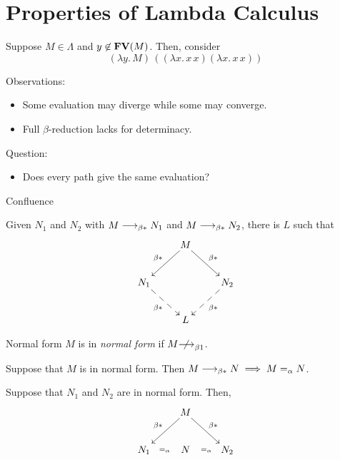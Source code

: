 \section{Properties of Lambda Calculus}

\begin{frame}
  \begin{example}
    Suppose $M \in \Lambda$ and $y \not\in \mathbf{FV}(M)$. 
    Then, consider 
    \[
      (\lambda y.\, M)\, ((\lambda x.\, x\,x)(\lambda x.\, x\, x))
    \]
  \end{example}
  Observations:
  \begin{itemize}
    \item Some evaluation may diverge while some may converge.
    \item Full $\beta$-reduction lacks for determinacy. 
  \end{itemize}
  Question:
  \begin{itemize}
    \item Does every path give the same evaluation?
  \end{itemize}
\end{frame}

\begin{frame}{Confluence}
\begin{theorem}
  Given $N_1$ and $N_2$ with $M \longrightarrow_{\beta*} N_1$ and $M\longrightarrow_{\beta*} N_2$, there is $L$
  such that
  \[
    \xymatrix{
      & M \ar[rd]^{\beta*} \ar[ld]_{\beta*} \\
      N_1 \ar@{-->}[rd]_{\beta*} & & N_2 \ar@{-->}[ld]^{\beta*} \\
      & L
    }
  \]
\end{theorem}
\end{frame}

\begin{frame}{Normal form}
  $M$ is in \emph{normal form} if $M \notonereduce$. 

  \begin{lemma}\label{lem:normal-no-reduction}
    Suppose that $M$ is in normal form. Then 
      $M \longrightarrow_{\beta*} N \implies M =_\alpha N$.
  \end{lemma}

  \begin{corollary}\label{coro:uniqueness-normal}
    Suppose that $N_1$ and $N_2$ are in normal form. Then, 
    \[
      \xymatrix{
        & M \ar[rd]^{\beta*} \ar[ld]_{\beta*} \\
        N_1 \ar@{}[r]|{=_{\alpha}} & N & N_2 \ar@{}[l]|{=_\alpha} \\
      }
    \]
  \end{corollary}
\end{frame}

